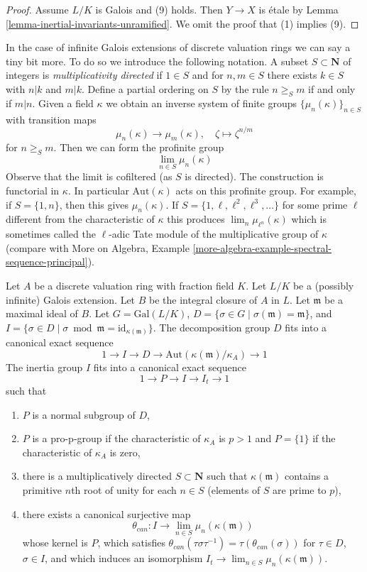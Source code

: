 \begin{proof}
\medskip\noindent
Assume $L/K$ is Galois and (9) holds. Then $Y \to X$ is \'etale
by Lemma \ref{lemma-inertial-invariants-unramified}.
We omit the proof that (1) implies (9).
\end{proof}

\noindent
In the case of infinite Galois extensions of discrete valuation rings
we can say a tiny bit more. To do so we introduce the following notation.
A subset $S \subset \mathbf{N}$ of integers is {\it multiplicativity directed}
if $1 \in S$ and for $n, m \in S$ there exists $k \in S$ with
$n | k$ and $m | k$. Define a partial ordering on $S$ by the rule
$n \geq_S m$ if and only if $m | n$. Given a field $\kappa$ we obtain
an inverse system of finite groups $\{\mu_n(\kappa)\}_{n \in S}$
with transition maps
$$
\mu_n(\kappa) \longrightarrow \mu_m(\kappa),\quad
\zeta \longmapsto \zeta^{n/m}
$$
for $n \geq_S m$. Then we can form the profinite group
$$
\lim_{n \in S} \mu_n(\kappa)
$$
Observe that the limit is cofiltered (as $S$ is directed).
The construction is functorial in $\kappa$. In particular
$\text{Aut}(\kappa)$ acts on this profinite group.
For example, if $S = \{1, n\}$, then this gives $\mu_n(\kappa)$.
If $S = \{1, \ell, \ell^2, \ell^3, \ldots\}$ for some prime
$\ell$ different from the characteristic of $\kappa$ this produces
$\lim_n \mu_{\ell^n}(\kappa)$
which is sometimes called the $\ell$-adic Tate module of the multiplicative
group of $\kappa$ (compare with
More on Algebra, Example
\ref{more-algebra-example-spectral-sequence-principal}).

\begin{lemma}
\label{lemma-structure-decomposition}
Let $A$ be a discrete valuation ring with fraction field $K$.
Let $L/K$ be a (possibly infinite) Galois extension.
Let $B$ be the integral closure of $A$ in $L$.
Let $\mathfrak m$ be a maximal ideal of $B$.
Let $G = \text{Gal}(L/K)$,
$D = \{\sigma \in G \mid \sigma(\mathfrak m) = \mathfrak m\}$, and
$I = \{\sigma \in D \mid \sigma \bmod \mathfrak m =
\text{id}_{\kappa(\mathfrak m)}\}$.
The decomposition group $D$ fits into a canonical exact sequence
$$
1 \to I \to D \to \text{Aut}(\kappa(\mathfrak m)/\kappa_A) \to 1
$$
The inertia group $I$ fits into a canonical exact sequence
$$
1 \to P \to I \to I_t \to 1
$$
such that
\begin{enumerate}
\item $P$ is a normal subgroup of $D$,
\item $P$ is a pro-p-group if the characteristic of
$\kappa_A$ is $p > 1$ and $P = \{1\}$ if the characteristic of $\kappa_A$
is zero,
\item there is a multiplicatively directed $S \subset \mathbf{N}$
such that $\kappa(\mathfrak m)$ contains a primitive $n$th root of unity
for each $n \in S$ (elements of $S$ are prime to $p$),
\item there exists a canonical surjective map
$$
\theta_{can} : I \to \lim_{n \in S} \mu_n(\kappa(\mathfrak m))
$$
whose kernel is $P$, which satisfies
$\theta_{can}(\tau \sigma \tau^{-1}) = \tau(\theta_{can}(\sigma))$
for $\tau \in D$, $\sigma \in I$, and which induces an isomorphism
$I_t \to \lim_{n \in S} \mu_n(\kappa(\mathfrak m))$.
\end{enumerate}
\end{lemma}

